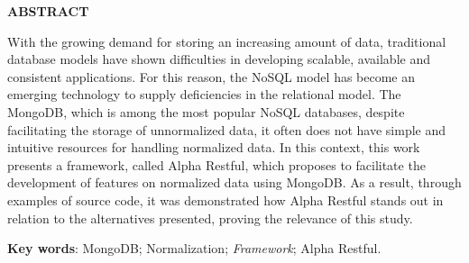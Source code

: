 \vfill
\begin{center}
{\textbf{ABSTRACT}\\}
\end{center}

\noindent

With the growing demand for storing an increasing amount of data, traditional database models have shown difficulties in developing scalable, available and consistent applications. For this reason, the NoSQL model has become an emerging technology to supply deficiencies in the relational model. The MongoDB, which is among the most popular NoSQL databases, despite facilitating the storage of unnormalized data, it often does not have simple and intuitive resources for handling normalized data. In this context, this work presents a framework, called Alpha Restful, which proposes to facilitate the development of features on normalized data using MongoDB. As a result, through examples of source code, it was demonstrated how Alpha Restful stands out in relation to the alternatives presented, proving the relevance of this study.
 
 \vspace{\onelineskip}
    
 \noindent
 \textbf{Key words}: MongoDB; Normalization; \textit{Framework}; Alpha Restful.
